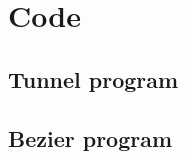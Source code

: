 \chapter{Code}

\section{Tunnel program}
\label{app:tunnel}


\section{Bezier program}
\label{app:bez}
